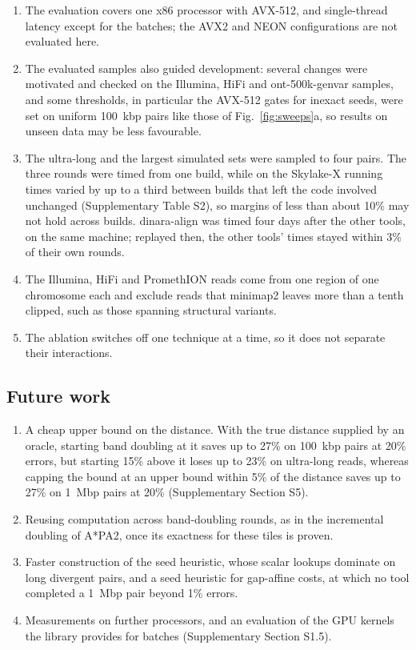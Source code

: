 \begin{enumerate}
  \item The evaluation covers one x86 processor with AVX-512, and single-thread latency except for the batches; the AVX2 and NEON configurations are not evaluated here.
  \item The evaluated samples also guided development: several changes were motivated and checked on the Illumina, HiFi and ont-500k-genvar samples, and some thresholds, in particular the AVX-512 gates for inexact seeds, were set on uniform 100~kbp pairs like those of Fig.~\ref{fig:sweeps}a, so results on unseen data may be less favourable.
  \item The ultra-long and the largest simulated sets were sampled to four pairs. The three rounds were timed from one build, while on the Skylake-X running times varied by up to a third between builds that left the code involved unchanged (Supplementary Table S2), so margins of less than about 10\% may not hold across builds. dinara-align was timed four days after the other tools, on the same machine; replayed then, the other tools' times stayed within 3\% of their own rounds.
  \item The Illumina, HiFi and PromethION reads come from one region of one chromosome each and exclude reads that minimap2 leaves more than a tenth clipped, such as those spanning structural variants.
  \item The ablation switches off one technique at a time, so it does not separate their interactions.
\end{enumerate}

\subsection{Future work}

\begin{enumerate}
  \item A cheap upper bound on the distance. With the true distance supplied by an oracle, starting band doubling at it saves up to 27\% on 100~kbp pairs at 20\% errors, but starting 15\% above it loses up to 23\% on ultra-long reads, whereas capping the bound at an upper bound within 5\% of the distance saves up to 27\% on 1~Mbp pairs at 20\% (Supplementary Section S5).
  \item Reusing computation across band-doubling rounds, as in the incremental doubling of A*PA2, once its exactness for these tiles is proven.
  \item Faster construction of the seed heuristic, whose scalar lookups dominate on long divergent pairs, and a seed heuristic for gap-affine costs, at which no tool completed a 1~Mbp pair beyond 1\% errors.
  \item Measurements on further processors, and an evaluation of the GPU kernels the library provides for batches (Supplementary Section S1.5).
\end{enumerate}
